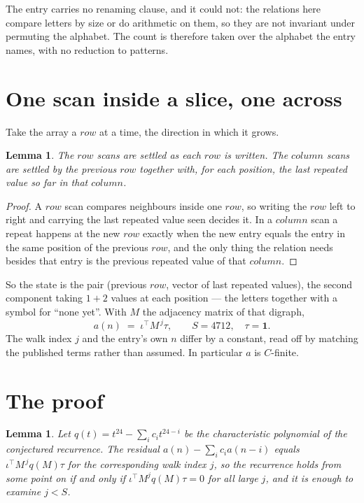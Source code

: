 \documentclass[11pt,a4paper]{article}
\theoremstyle{plain}
\newtheorem{lemma}[theorem]{Lemma}
\theoremstyle{definition}
\begin{document}
The entry carries no renaming clause, and it could not: the relations here compare letters by
size or do arithmetic on them, so they are not invariant under permuting the alphabet. The
count is therefore taken over the alphabet the entry names, with no reduction to patterns.

\section{One scan inside a slice, one across}

Take the array a $row$ at a time, the direction in which it grows.

\begin{lemma}\label{lem:state}
The $row$ scans are settled as each $row$ is written. The $column$ scans are
settled by the previous $row$ together with, for each position, the last repeated value
so far in that $column$.
\end{lemma}

\begin{proof}
A $row$ scan compares neighbours inside one $row$, so writing the
$row$ left to right and carrying the last repeated value seen decides it. In a
$column$ scan a repeat happens at the new $row$ exactly when the new entry equals the
entry in the same position of the previous $row$, and the only thing the relation needs
besides that entry is the previous repeated value of that $column$.
\end{proof}

So the state is the pair (previous $row$, vector of last repeated values), the second
component taking $1+2$ values at each position --- the letters together with a symbol for
``none yet''. With $M$ the adjacency matrix of that digraph,
\[
a(n)\;=\;\iota^{\!\top}M^{\,j}\tau ,\qquad S=4712,\quad\tau=\mathbf{1} .
\]
The walk index $j$ and the entry's own $n$ differ by a constant, read off by matching the
published terms rather than assumed. In particular $a$ is $C$-finite.

\section{The proof}

\begin{lemma}\label{lem:crit}
Let $q(t)=t^{24}-\sum_i c_it^{24-i}$ be the characteristic polynomial of the
conjectured recurrence. The residual $a(n)-\sum_ic_ia(n-i)$ equals
$\iota^{\!\top}M^{\,j}q(M)\tau$ for the corresponding walk index $j$, so the recurrence
holds from some point on if and only if $\iota^{\!\top}M^{j}q(M)\tau=0$ for all large $j$,
and it is enough to examine $j<S$.
\end{lemma}
\end{document}
